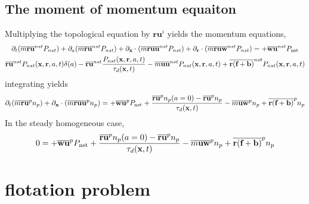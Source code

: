 \subsection*{The moment of momentum equaiton}
Multiplying the topological equation by $\textbf{r}\textbf{u}^i$ yields the momentum equations, 
\begin{multline}
    \partial_t (\overline{m\textbf{ru}}^{nst} P_{nst})
    + \partial_a (\overline{m\textbf{ru}}^{nst} P_{nst})
    + \partial_{\textbf{x}} \cdot (\overline{m\textbf{ru}\textbf{u} }^{nst} P_{nst})
    + \partial_{\textbf{r}}  \cdot (\overline{m\textbf{ru}\textbf{w}}^{nst} P_{nst})
    =  
    + \overline{\textbf{wu}}^{nst}P_\text{nst}
    \\
    \overline{\textbf{ru}}^{nst} P_{nst}(\textbf{x},\textbf{r},a,t)\delta(a)
    - \overline{\textbf{ru}}^{nst}  \frac{P_{nst}(\textbf{x},\textbf{r},a,t)}{\tau_d(\textbf{x},t)}
    - \overline{m\textbf{uu}}^{nst}P_{nst}(\textbf{x},\textbf{r},a,t)
    + \overline{\textbf{r}(\textbf{f}+\textbf{b})}^{nst}P_{nst}(\textbf{x},\textbf{r},a,t)
\end{multline}
integrating yields
\begin{multline}
    \partial_t (\overline{m\textbf{ru}}^{p} n_p)
    + \partial_{\textbf{x}} \cdot (\overline{m\textbf{ru}\textbf{u} }^{p} n_p)
    =  
    + \overline{\textbf{wu}}^{p}P_\text{nst}
    +  \frac{\overline{\textbf{ru}}^{p}n_p(a=0) -\overline{\textbf{ru}}^{p} n_p}{\tau_d(\textbf{x},t)}
    - \overline{m\textbf{uw}}^{p}n_p 
    + \overline{\textbf{r}(\textbf{f}+\textbf{b})}^{p}n_p 
\end{multline}
In the steady homogeneous case, 
\begin{multline}
    0
    =  
    + \overline{\textbf{wu}}^{p}P_\text{nst}
    +  \frac{\overline{\textbf{ru}}^{p}n_p(a=0) -\overline{\textbf{ru}}^{p} n_p}{\tau_d(\textbf{x},t)}
    - \overline{m\textbf{uw}}^{p}n_p 
    + \overline{\textbf{r}(\textbf{f}+\textbf{b})}^{p}n_p 
\end{multline}

\section{flotation problem}

